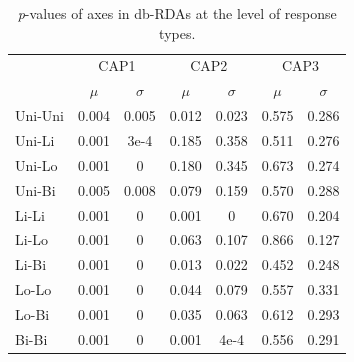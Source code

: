 			\begin{table}[h!]
				  
				\small
				\caption{\textit{p}-values of axes in db-RDAs at the level of response types.}
				\centering
				
				\begin{tabular}{@{}lcccccc@{}}
					
					\toprule
					& \multicolumn{2}{c}{CAP1} & \multicolumn{2}{c}{CAP2} & \multicolumn{2}{c}{CAP3}\\\cmidrule(l){2-3} \cmidrule(l){4-5} \cmidrule(l){6-7}
					& $\mu$ & $\sigma$ & $\mu$ & $\sigma$ & $\mu$ & $\sigma$\\
					\hline
					Uni-Uni& 0.004 & 0.005	 & 0.012 & 0.023 & 0.575 & 0.286\\
					Uni-Li& 0.001 & 3e-4 & 0.185 & 0.358 & 0.511 & 0.276\\
					Uni-Lo& 0.001 & 0 & 0.180 & 0.345 & 0.673 & 0.274\\
					Uni-Bi& 0.005 & 0.008 & 0.079 & 0.159 & 0.570 & 0.288\\
					Li-Li & 0.001 & 0 & 0.001 & 0 & 0.670 & 0.204\\
					Li-Lo & 0.001 & 0 & 0.063 & 0.107 & 0.866 & 0.127\\
					Li-Bi & 0.001 & 0 & 0.013 & 0.022 & 0.452 & 0.248\\
					Lo-Lo & 0.001 & 0 & 0.044 & 0.079 & 0.557 & 0.331\\
					Lo-Bi & 0.001 & 0 & 0.035 & 0.063 & 0.612 & 0.293\\
					Bi-Bi & 0.001 & 0 & 0.001 & 4e-4 & 0.556 & 0.291\\
					\toprule
					
				\end{tabular}
			
				\label{tab:dbsm3}
			
			\end{table}	
		
